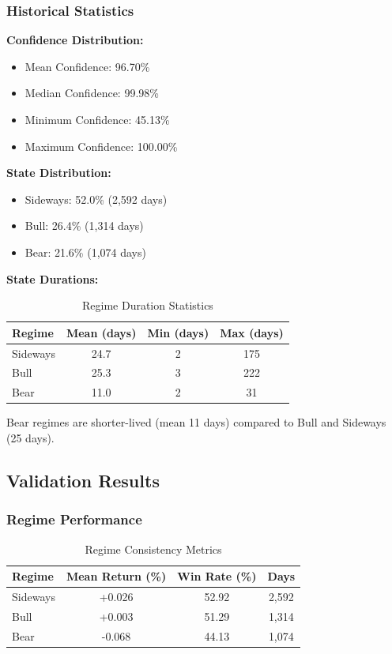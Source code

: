 \documentclass[conference]{IEEEtran}
\begin{document}
\subsubsection{Historical Statistics}
\textbf{Confidence Distribution:}
\begin{itemize}
\item Mean Confidence: 96.70\%
\item Median Confidence: 99.98\%
\item Minimum Confidence: 45.13\%
\item Maximum Confidence: 100.00\%
\end{itemize}

\textbf{State Distribution:}
\begin{itemize}
\item Sideways: 52.0\% (2,592 days)
\item Bull: 26.4\% (1,314 days)
\item Bear: 21.6\% (1,074 days)
\end{itemize}

\textbf{State Durations:}
\begin{table}[htbp]
\centering
\caption{Regime Duration Statistics}
\label{tab:durations}
\begin{tabular}{lccc}
\toprule
\textbf{Regime} & \textbf{Mean (days)} & \textbf{Min (days)} & \textbf{Max (days)} \\
\midrule
Sideways & 24.7 & 2 & 175 \\
Bull & 25.3 & 3 & 222 \\
Bear & 11.0 & 2 & 31 \\
\bottomrule
\end{tabular}
\end{table}

Bear regimes are shorter-lived (mean 11 days) compared to Bull and Sideways (25 days).

\subsection{Validation Results}

\subsubsection{Regime Performance}
\begin{table}[htbp]
\centering
\caption{Regime Consistency Metrics}
\label{tab:regime_performance}
\begin{tabular}{lccc}
\toprule
\textbf{Regime} & \textbf{Mean Return (\%)} & \textbf{Win Rate (\%)} & \textbf{Days} \\
\midrule
Sideways & +0.026 & 52.92 & 2,592 \\
Bull & +0.003 & 51.29 & 1,314 \\
Bear & -0.068 & 44.13 & 1,074 \\
\bottomrule
\end{tabular}
\end{table}
\end{document}
